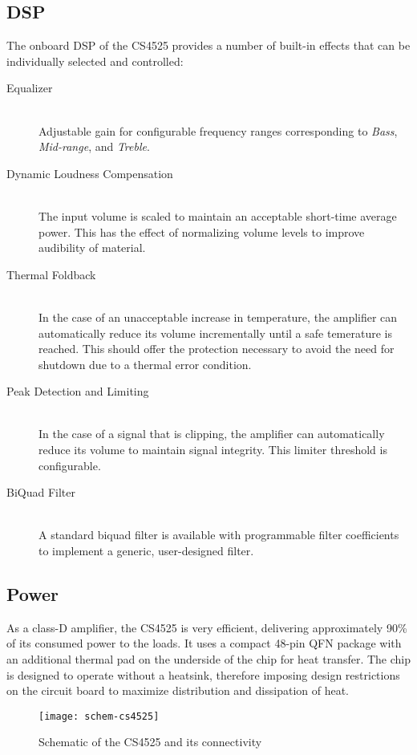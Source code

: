 \subsection{DSP}
\label{sec:dsp}
The onboard DSP of the CS4525 provides a number of built-in effects that can be individually selected and controlled:
\begin{description}
\item[Equalizer] \hfill \\
Adjustable gain for configurable frequency ranges corresponding to \emph{Bass}, \emph{Mid-range}, and \emph{Treble}. 
\item[Dynamic Loudness Compensation] \hfill \\
The input volume is scaled to maintain an acceptable short-time average power. This has the effect of normalizing volume levels to improve audibility of material.
\item[Thermal Foldback] \hfill \\
In the case of an unacceptable increase in temperature, the amplifier can automatically reduce its volume incrementally until a safe temerature is reached. This should offer the protection necessary to avoid the need for shutdown due to a thermal error condition.
\item[Peak Detection and Limiting] \hfill \\
In the case of a signal that is clipping, the amplifier can automatically reduce its volume to maintain signal integrity. This limiter threshold is configurable.
\item[BiQuad Filter] \hfill \\
A standard biquad filter is available with programmable filter coefficients to implement a generic, user-designed filter.
\end{description}

\subsection{Power}
As a class-D amplifier, the CS4525 is very efficient, delivering approximately 90\% of its consumed power to the loads. It uses a compact 48-pin QFN package with an additional thermal pad on the underside of the chip for heat transfer. The chip is designed to operate without a heatsink, therefore imposing design restrictions on the circuit board to maximize distribution and dissipation of heat.
\begin{figure}[H]
	\centering
	\texttt{[image: schem-cs4525]}
	\caption[Schematic -- CS4525 Amplifier]%
	{Schematic of the CS4525 and its connectivity}
\end{figure}


